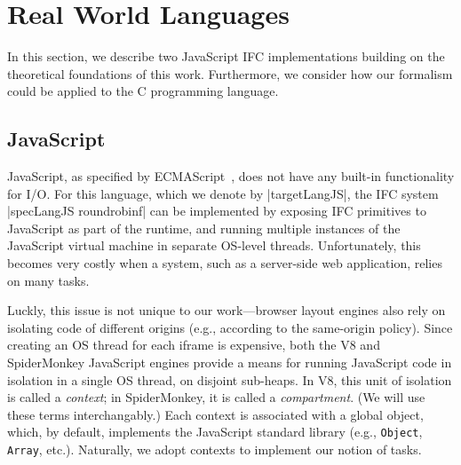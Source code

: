 \section{Real World Languages}
\label{sec:real}

In this section, we describe two JavaScript IFC implementations
building on the theoretical foundations of this work.
%
Furthermore, we consider how our formalism could be applied to the C
programming language.
%
%


\subsection{JavaScript}
\label{sec:real:js}

JavaScript, as specified by
ECMAScript~\cite{ecma}, does not have any built-in
functionality for I/O.
%
For this language, which we denote by |targetLangJS|, the IFC system
|specLangJS roundrobinf| can be implemented by exposing IFC primitives
to JavaScript as part of the runtime, and running multiple instances
of the JavaScript virtual machine in separate OS-level threads.
%
Unfortunately, this becomes very costly when a system, such as a
server-side web application, relies on many tasks.
%

Luckly, this issue is not unique to our work---browser layout engines
also rely on isolating code of different origins (e.g., according to the
same-origin policy).
%
Since creating an OS thread for each iframe is expensive, both
the V8 and SpiderMonkey JavaScript engines provide a means for running
JavaScript code in isolation in a single OS thread,
on disjoint sub-heaps.
%
In V8, this unit of isolation is called a \emph{context}; in
SpiderMonkey, it is called a \emph{compartment}.
%
(We will use these terms interchangably.)
%
Each context is associated with a global object, which, by
default, implements the JavaScript standard library (e.g.,
\verb|Object|, \verb|Array|, etc.).
%
Naturally, we adopt contexts to implement our notion of tasks.


